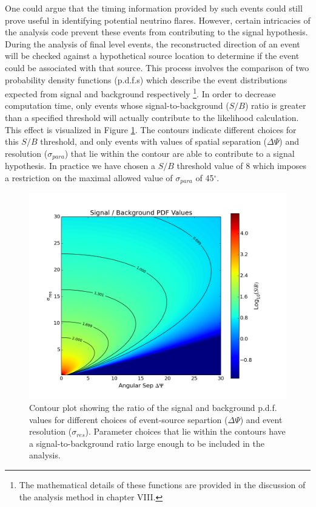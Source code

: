\documentclass{gatech-thesis}
\begin{document}
One could argue that the timing information provided by such events could still prove useful in identifying potential neutrino flares. However, certain intricacies of the analysis code prevent these events from contributing to the signal hypothesis. During the analysis of final level events, the reconstructed direction of an event will be checked against a hypothetical source location to determine if the event could be associated with that source. This process involves the comparison of two probability density functions (p.d.f.s) which describe the event distributions expected from signal and background respectively \footnote{The mathematical details of these functions are provided in the discussion of the analysis method in chapter VIII.}. In order to decrease computation time, only events whose signal-to-background ($S/B$) ratio is greater than a specified threshold will actually contribute to the likelihood calculation. This effect is visualized in Figure \ref{fig:QualityCutParameterSpace}. The contours indicate different choices for this $S/B$ threshold, and only events with values of spatial separation ($\Delta \Psi$) and resolution ($\sigma_{para}$) that lie within the contour are able to contribute to a signal hypothesis. In practice we have chosen a $S/B$ threshold value of 8 which imposes a restriction on the maximal allowed value of $\sigma_{para}$ of 45$^{\circ}$.

\begin{figure}[ht]
  \begin{center}
    \includegraphics[width=.65\textwidth,keepaspectratio]{SignalOverBackground_ContourMap.png}
  \end{center}
  \caption{Contour plot showing the ratio of the signal and background p.d.f. values for different choices of event-source separtion ($\Delta \Psi$) and event resolution ($\sigma_{res}$). Parameter choices that lie within the contours have a signal-to-background ratio large enough to be included in the analysis.}
  \label{fig:QualityCutParameterSpace}
\end{figure}
\end{document}
